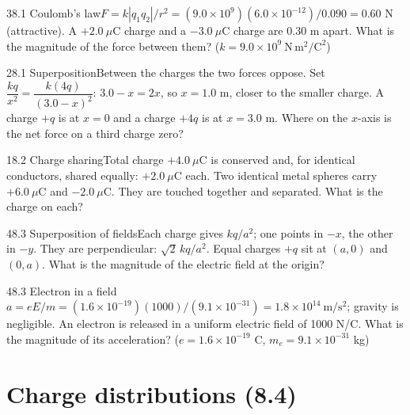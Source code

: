 \documentclass[11pt]{article}
\begin{document}
\begin{q}{3}{8.1 Coulomb's law}{$F = k|q_1q_2|/r^2 = (9.0\times10^9)(6.0\times10^{-12})/0.090 = 0.60$ N (attractive).}
A $+2.0\ \mu\mathrm{C}$ charge and a $-3.0\ \mu\mathrm{C}$ charge are 0.30 m apart. What is the magnitude of the force between them? ($k = 9.0\times10^9\ \mathrm{N\,m^2/C^2}$)
\end{q}
\begin{q}{2}{8.1 Superposition}{Between the charges the two forces oppose. Set $\dfrac{kq}{x^2} = \dfrac{k(4q)}{(3.0 - x)^2}$: $3.0 - x = 2x$, so $x = 1.0$ m, closer to the smaller charge.}
A charge $+q$ is at $x = 0$ and a charge $+4q$ is at $x = 3.0$ m. Where on the $x$-axis is the net force on a third charge zero?
\end{q}
\begin{q}{1}{8.2 Charge sharing}{Total charge $+4.0\ \mu\mathrm{C}$ is conserved and, for identical conductors, shared equally: $+2.0\ \mu\mathrm{C}$ each.}
Two identical metal spheres carry $+6.0\ \mu\mathrm{C}$ and $-2.0\ \mu\mathrm{C}$. They are touched together and separated. What is the charge on each?
\end{q}
\begin{q}{4}{8.3 Superposition of fields}{Each charge gives $kq/a^2$; one points in $-x$, the other in $-y$. They are perpendicular: $\sqrt2\,kq/a^2$.}
Equal charges $+q$ sit at $(a, 0)$ and $(0, a)$. What is the magnitude of the electric field at the origin?
\end{q}
\begin{q}{4}{8.3 Electron in a field}{$a = eE/m = (1.6\times10^{-19})(1000)/(9.1\times10^{-31}) = 1.8\times10^{14}\ \mathrm{m/s^2}$; gravity is negligible.}
An electron is released in a uniform electric field of 1000 N/C. What is the magnitude of its acceleration? ($e = 1.6\times10^{-19}$ C, $m_e = 9.1\times10^{-31}$ kg)
\end{q}

\section{Charge distributions (8.4)}
\end{document}
